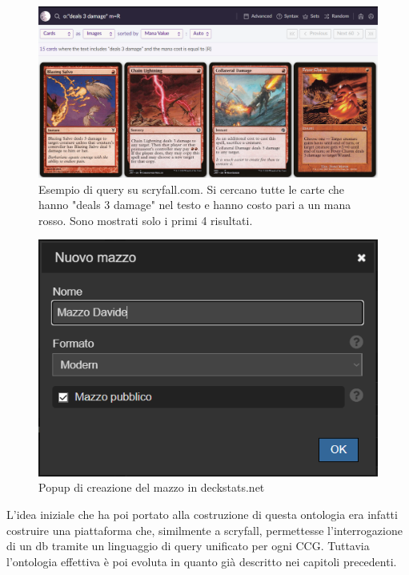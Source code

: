 \documentclass[12pt]{article}
\begin{document}
\begin{figure}[H]
    \centering
         \includegraphics[width=14cm]{files/scryfall_query.png}
    \caption{Esempio di query su scryfall.com. Si cercano tutte le carte che hanno "deals 3 damage" nel testo e hanno costo pari a un mana rosso. Sono mostrati solo i primi 4 risultati.}
    \label{fig:scryfall_query}
\end{figure}

\begin{figure}[H] 
    \centering
         \includegraphics{files/deckstats_1.png}
    \caption{Popup di creazione del mazzo in deckstats.net}
    \label{fig:deckstats_1}
\end{figure}


L'idea iniziale che ha poi portato alla costruzione di questa ontologia era infatti costruire una piattaforma che, similmente a scryfall, permettesse l'interrogazione di un db tramite un linguaggio di query unificato per ogni CCG. Tuttavia l'ontologia effettiva è poi evoluta in quanto già descritto nei capitoli precedenti.
\end{document}
